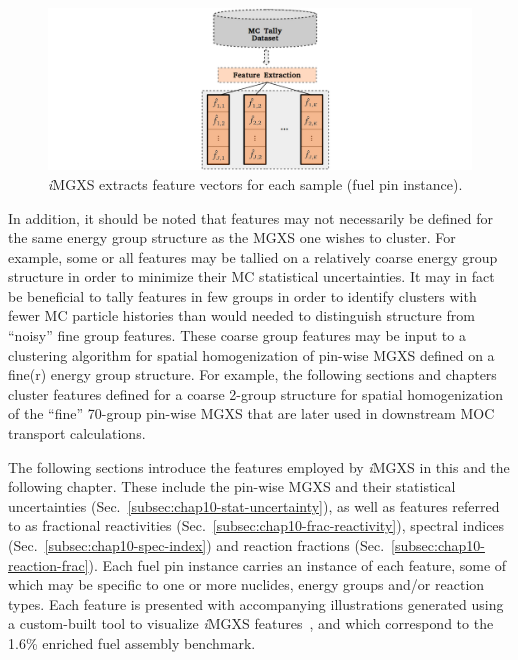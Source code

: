 \begin{figure}[h!]
\centering
\includegraphics[width=0.9\linewidth]{figures/unsupervised/features/engineering/extract}
\vspace{2mm}
\caption[\textit{i}MGXS sample feature extraction]{\textit{i}\ac{MGXS} extracts feature vectors for each sample (fuel pin instance).}
\label{fig:chap10-feature-extract}
\end{figure}

In addition, it should be noted that features may not necessarily be defined for the same energy group structure as the \ac{MGXS} one wishes to cluster. For example, some or all features may be tallied on a relatively coarse energy group structure in order to minimize their \ac{MC} statistical uncertainties. It may in fact be beneficial to tally features in few groups in order to identify clusters with fewer \ac{MC} particle histories than would needed to distinguish structure from ``noisy'' fine group features.
These coarse group features may be input to a clustering algorithm for spatial homogenization of pin-wise \ac{MGXS} defined on a fine(r) energy group structure. For example, the following sections and chapters cluster features defined for a coarse 2-group structure for spatial homogenization of the ``fine'' 70-group pin-wise \ac{MGXS} that are later used in downstream \ac{MOC} transport calculations.

The following sections introduce the features employed by \textit{i}\ac{MGXS} in this and the following chapter. These include the pin-wise \ac{MGXS} and their statistical uncertainties (Sec.~\ref{subsec:chap10-stat-uncertainty}), as well as features referred to as fractional reactivities (Sec.~\ref{subsec:chap10-frac-reactivity}), spectral indices (Sec.~\ref{subsec:chap10-spec-index}) and reaction fractions (Sec.~\ref{subsec:chap10-reaction-frac}). Each fuel pin instance carries an instance of each feature, some of which may be specific to one or more nuclides, energy groups and/or reaction types. Each feature is presented with accompanying illustrations generated using a custom-built tool to visualize \textit{i}\ac{MGXS} features~\cite{abel2016bokeh}, and which correspond to the 1.6\% enriched fuel assembly benchmark.

